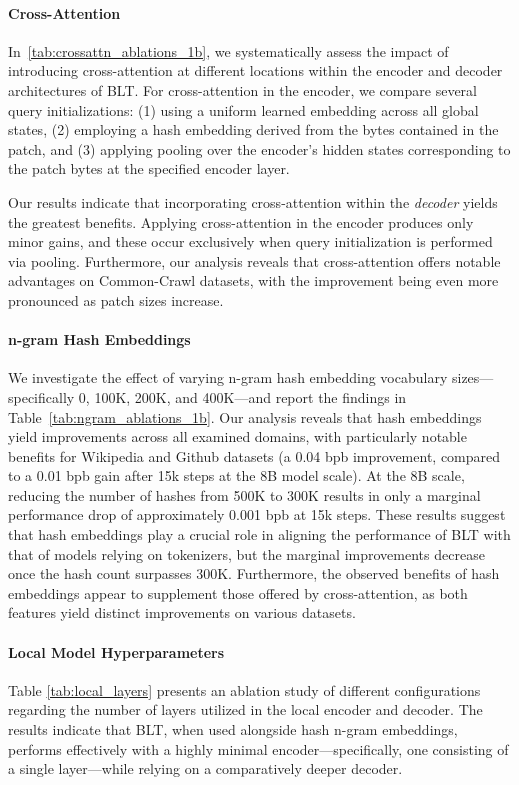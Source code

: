 \paragraph{Cross-Attention} 
In~\autoref{tab:crossattn_ablations_1b}, we systematically assess the impact of introducing cross-attention at different locations within the encoder and decoder architectures of {\textsc BLT}. For cross-attention in the encoder, we compare several query initializations: (1) using a uniform learned embedding across all global states, (2) employing a hash embedding derived from the bytes contained in the patch, and (3) applying pooling over the encoder’s hidden states corresponding to the patch bytes at the specified encoder layer.

Our results indicate that incorporating cross-attention within the \textit{decoder} yields the greatest benefits. Applying cross-attention in the encoder produces only minor gains, and these occur exclusively when query initialization is performed via pooling. Furthermore, our analysis reveals that cross-attention offers notable advantages on Common-Crawl datasets, with the improvement being even more pronounced as patch sizes increase.

\paragraph{n-gram Hash Embeddings} 

We investigate the effect of varying n-gram hash embedding vocabulary sizes—specifically 0, 100K, 200K, and 400K—and report the findings in Table~\ref{tab:ngram_ablations_1b}. Our analysis reveals that hash embeddings yield improvements across all examined domains, with particularly notable benefits for Wikipedia and Github datasets (a 0.04 bpb improvement, compared to a 0.01 bpb gain after 15k steps at the 8B model scale). At the 8B scale, reducing the number of hashes from 500K to 300K results in only a marginal performance drop of approximately 0.001 bpb at 15k steps. These results suggest that hash embeddings play a crucial role in aligning the performance of {\textsc BLT} with that of models relying on tokenizers, but the marginal improvements decrease once the hash count surpasses 300K. Furthermore, the observed benefits of hash embeddings appear to supplement those offered by cross-attention, as both features yield distinct improvements on various datasets.

\paragraph{Local Model Hyperparameters} Table \ref{tab:local_layers} presents an ablation study of different configurations regarding the number of layers utilized in the local encoder and decoder. The results indicate that {\textsc BLT}, when used alongside hash n-gram embeddings, performs effectively with a highly minimal encoder—specifically, one consisting of a single layer—while relying on a comparatively deeper decoder.

